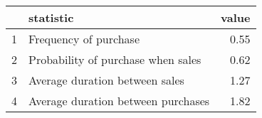 \begin{tabular}{rlr}
  \hline
 & statistic & value \\ 
  \hline
1 & Frequency of purchase & 0.55 \\ 
  2 & Probability of purchase when sales & 0.62 \\ 
  3 & Average duration between sales & 1.27 \\ 
  4 & Average duration between purchases & 1.82 \\ 
   \hline
\end{tabular}
